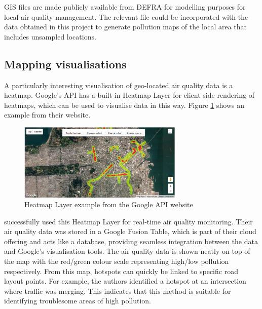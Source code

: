 \documentclass[11pt]{report}
\begin{document}
GIS files are made publicly available from DEFRA for modelling purposes for local air quality management. The relevant file could be incorporated with the data obtained in this project to generate pollution maps of the local area that includes unsampled locations.


\subsection{Mapping visualisations}

A particularly interesting visualisation of geo-located air quality data is a heatmap. Google's API has a built-in Heatmap Layer for client-side rendering of heatmaps, which can be used to visualise data in this way. Figure \ref{heatmap} shows an example from their website. 


\begin{figure}[!htb]
\centering
\includegraphics[width=0.7\textwidth]{googleapi_heatmap_layer}
\caption{Heatmap Layer example from the Google API website \citep{google2018heatmap}}
\label{heatmap}
\end{figure}

\cite{Devarakonda2013} successfully used this Heatmap Layer for real-time air quality monitoring. Their air quality data was stored in a Google Fusion Table, which is part of their cloud offering and acts like a database, providing seamless integration between the data and Google's visualisation tools. The air quality data is shown neatly on top of the map with the red/green colour scale representing high/low pollution respectively. From this map, hotspots can quickly be linked to specific road layout points. For example, the authors identified a hotspot at an intersection where traffic was merging. This indicates that this method is suitable for identifying troublesome areas of high pollution.
\end{document}
